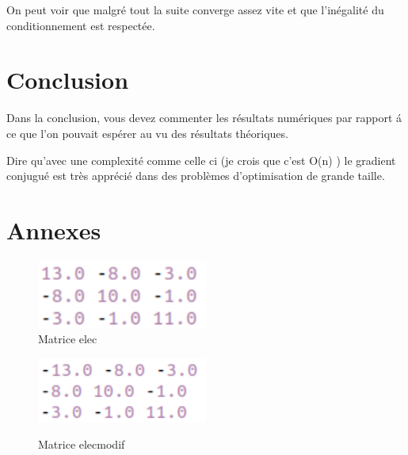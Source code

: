 \documentclass[12,french]{report}
\begin{document}
On peut voir que malgré tout la suite converge assez vite et que l'inégalité du conditionnement est respectée.

\chapter*{Conclusion}

Dans la conclusion, vous devez commenter les résultats numériques par rapport á ce que l’on pouvait espérer au vu des résultats théoriques.

Dire qu'avec une complexité comme celle ci (je crois que c'est O(n) ) le gradient conjugué est très apprécié dans des problèmes d'optimisation de grande taille.

\chapter*{Annexes}
\begin{figure}[H]
    \begin{minipage}[c]{.46\linewidth}
        \centering
        \includegraphics[width=0.5\textwidth]{./Images/elec}\\
        \caption*{Matrice elec}
    \end{minipage}
    \hfill%
    \begin{minipage}[c]{.46\linewidth}
        \centering
        \includegraphics[width=0.5\textwidth]{./Images/elecmodif}\\
        \caption*{Matrice elecmodif}
    \end{minipage}
\end{figure}%
\end{document}
